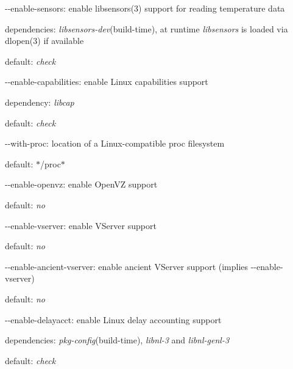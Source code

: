 \begin{DoxyItemize}
\item {\ttfamily -\/-\/enable-\/sensors}\+: enable libsensors(3) support for reading temperature data
\begin{DoxyItemize}
\item dependencies\+: {\itshape libsensors-\/dev}(build-\/time), at runtime {\itshape libsensors} is loaded via {\ttfamily dlopen(3)} if available
\item default\+: {\itshape check}
\end{DoxyItemize}
\item {\ttfamily -\/-\/enable-\/capabilities}\+: enable Linux capabilities support
\begin{DoxyItemize}
\item dependency\+: {\itshape libcap}
\item default\+: {\itshape check}
\end{DoxyItemize}
\item {\ttfamily -\/-\/with-\/proc}\+: location of a Linux-\/compatible proc filesystem
\begin{DoxyItemize}
\item default\+: $\ast$/proc$\ast$
\end{DoxyItemize}
\item {\ttfamily -\/-\/enable-\/openvz}\+: enable Open\+VZ support
\begin{DoxyItemize}
\item default\+: {\itshape no}
\end{DoxyItemize}
\item {\ttfamily -\/-\/enable-\/vserver}\+: enable V\+Server support
\begin{DoxyItemize}
\item default\+: {\itshape no}
\end{DoxyItemize}
\item {\ttfamily -\/-\/enable-\/ancient-\/vserver}\+: enable ancient V\+Server support (implies {\ttfamily -\/-\/enable-\/vserver})
\begin{DoxyItemize}
\item default\+: {\itshape no}
\end{DoxyItemize}
\item {\ttfamily -\/-\/enable-\/delayacct}\+: enable Linux delay accounting support
\begin{DoxyItemize}
\item dependencies\+: {\itshape pkg-\/config}(build-\/time), {\itshape libnl-\/3} and {\itshape libnl-\/genl-\/3}
\item default\+: {\itshape check}
\end{DoxyItemize}
\end{DoxyItemize}

